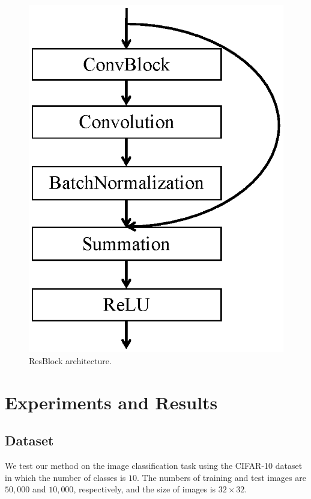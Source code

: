 \begin{figure}[t]
\includegraphics[scale=0.45]{images/resblock.eps}
\caption{ResBlock architecture.}
\label{resblock}
\end{figure}

\section{Experiments and Results}
\subsection{Dataset}
We test our method on the image classification task using the CIFAR-10 dataset in which the number of classes is $10$. The numbers of training and test images are $50,000$ and $10,000$, respectively, and the size of images is $32 \times 32$.

